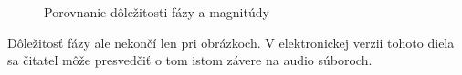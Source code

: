 \begin{figure}[htp]
    \def\path{obrazky/informatika/image_processing/mix_phase_magnitude/}
    \caption{Porovnanie dôležitosti fázy a magnitúdy}
    \label{fig:image_phase_magnitude}
\end{figure}
Dôležitosť fázy ale nekončí len pri obrázkoch. V elektronickej verzii
tohoto diela sa čitateľ môže presvedčiť o tom istom závere na audio
súboroch.


